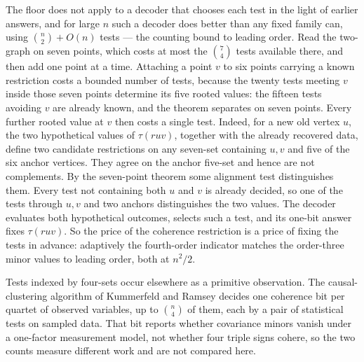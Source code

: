 \begin{remark}
The floor does not apply to a decoder that chooses each test in the light of
earlier answers, and for large \(n\) such a decoder does better than any
fixed family can, using \(\binom n2+O(n)\) tests --- the counting bound to
leading order.  Read the two-graph on seven points, which costs at most the
\(\binom74\) tests available there, and then add one point at a time.
Attaching a point \(v\) to six points carrying a known restriction costs a
bounded number of tests, because the twenty tests meeting \(v\) inside those
seven points determine its five rooted values: the fifteen tests avoiding
\(v\) are already known, and the theorem separates on seven points.  Every
further rooted value at \(v\) then costs a single test.  Indeed, for a new
old vertex \(u\), the two hypothetical values of \(\tau(ruv)\), together
with the already recovered data, define two candidate restrictions on any
seven-set containing \(u,v\) and five of the six anchor vertices.  They agree
on the anchor five-set and hence are not complements.  By the seven-point
theorem some alignment test distinguishes them.  Every test not containing
both \(u\) and \(v\) is already decided, so one of the tests through
\(u,v\) and two anchors distinguishes the two values.  The decoder evaluates
both hypothetical outcomes, selects such a test, and its one-bit answer fixes
\(\tau(ruv)\).  So the price of the coherence restriction is a
price of fixing the tests in advance: adaptively the fourth-order indicator
matches the order-three minor values to leading order, both at \(n^2/2\).

Tests indexed by four-sets occur elsewhere as a primitive observation.  The
causal-clustering algorithm of Kummerfeld and Ramsey \cite{KummerfeldRamsey}
decides one coherence bit per quartet of observed variables, up to
\(\binom n4\) of them, each by a pair of statistical tests on sampled data.
That bit reports whether covariance minors vanish under a one-factor
measurement model, not whether four triple signs cohere, so the two counts
measure different work and are not compared here.
\end{remark}

